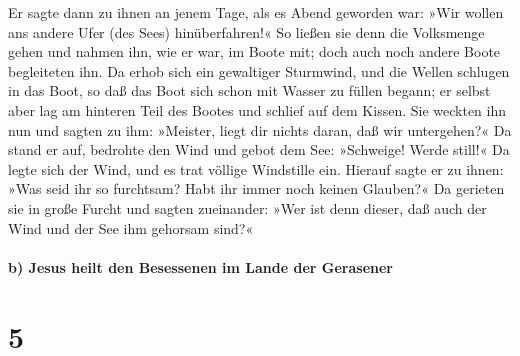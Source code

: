  Er sagte dann zu ihnen an jenem Tage, als es Abend
geworden war: »Wir wollen ans andere Ufer (des Sees) hinüberfahren!«
 So ließen sie denn die Volksmenge gehen und nahmen ihn,
wie er war, im Boote mit; doch auch noch andere Boote begleiteten ihn.
 Da erhob sich ein gewaltiger Sturmwind, und die Wellen
schlugen in das Boot, so daß das Boot sich schon mit Wasser zu füllen
begann;  er selbst aber lag am hinteren Teil des Bootes
und schlief auf dem Kissen. Sie weckten ihn nun und sagten zu ihm:
»Meister, liegt dir nichts daran, daß wir untergehen?« 
Da stand er auf, bedrohte den Wind und gebot dem See: »Schweige! Werde
still!« Da legte sich der Wind, und es trat völlige Windstille ein.
 Hierauf sagte er zu ihnen: »Was seid ihr so furchtsam?
Habt ihr immer noch keinen Glauben?«  Da gerieten sie in
große Furcht und sagten zueinander: »Wer ist denn dieser, daß auch der
Wind und der See ihm gehorsam sind?«

\hypertarget{b-jesus-heilt-den-besessenen-im-lande-der-gerasener}{%
\paragraph{b) Jesus heilt den Besessenen im Lande der
Gerasener}\label{b-jesus-heilt-den-besessenen-im-lande-der-gerasener}}

\hypertarget{section-4}{%
\section{5}\label{section-4}}

